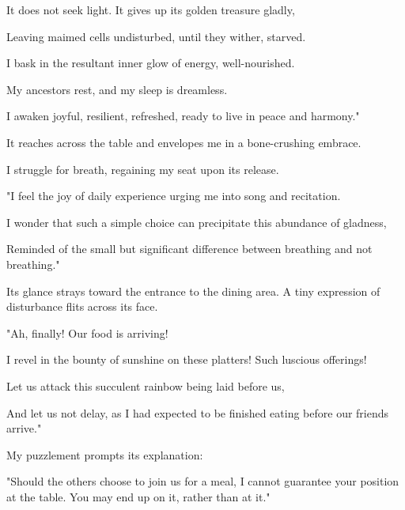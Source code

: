 It does not seek light. It gives up its golden treasure gladly,

Leaving maimed cells undisturbed, until they wither, starved.

I bask in the resultant inner glow of energy, well-nourished.

My ancestors rest, and my sleep is dreamless.

I awaken joyful, resilient, refreshed, ready to live in peace and
harmony."

It reaches across the table and envelopes me in a bone-crushing embrace.

I struggle for breath, regaining my seat upon its release.

"I feel the joy of daily experience urging me into song and recitation.

I wonder that such a simple choice can precipitate this abundance of
gladness,

Reminded of the small but significant difference between breathing and
not breathing."

Its glance strays toward the entrance to the dining area. A tiny
expression of disturbance flits across its face.

"Ah, finally! Our food is arriving!

I revel in the bounty of sunshine on these platters! Such luscious
offerings!

Let us attack this succulent rainbow being laid before us,

And let us not delay, as I had expected to be finished eating before our
friends arrive."

My puzzlement prompts its explanation:

"Should the others choose to join us for a meal, I cannot guarantee your
position at the table. You may end up on it, rather than at it."
